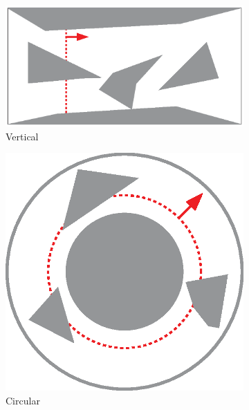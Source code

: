 \begin{figure}[t]
    \begin{subfigure}[t]{0.4\textwidth}
         \centering
         \includegraphics[width=\textwidth]{chapters/sc/fig/vertical.eps}
         \caption{Vertical}
         \label{fig:sc-vertical}
     \end{subfigure}
    \begin{subfigure}[t]{0.2\textwidth}
         \centering
         \includegraphics[width=\textwidth]{chapters/sc/fig/circular.eps}
         \caption{Circular}
         \label{fig:sc-radial}
     \end{subfigure}
    \begin{subfigure}[t]{0.2\textwidth}

\end{subfigure}
\end{figure}
